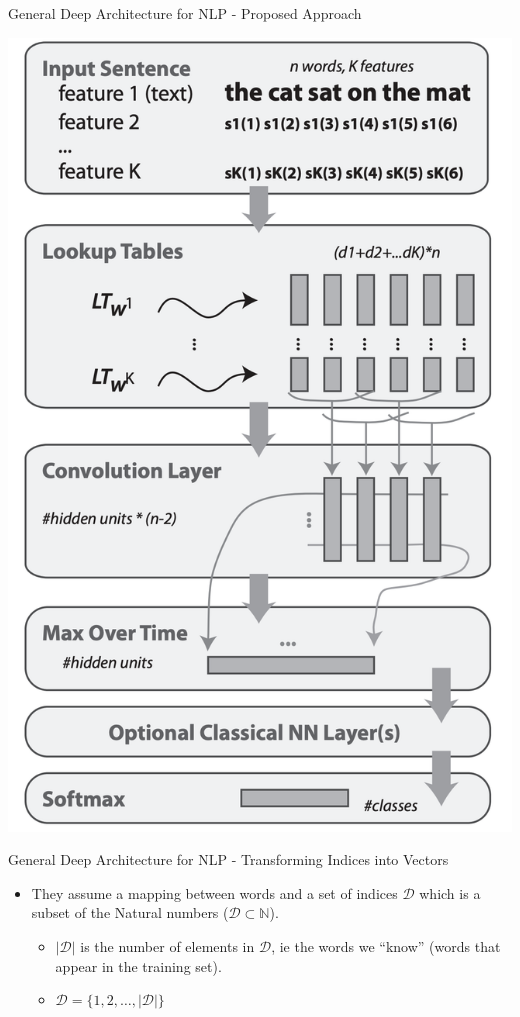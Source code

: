 \documentclass[handout]{beamer} %
\begin{document}
  \begin{frame}{General Deep Architecture for NLP - Proposed Approach}
      \begin{center}
          \includegraphics[scale=0.25]{imgs/Architecture.png}
      \end{center}
  \end{frame}

  \begin{frame}{General Deep Architecture for NLP - Transforming Indices into Vectors}
      \begin{itemize}[<+->]
          \item They assume a mapping between words and a set of indices
              $\mathcal{D}$ which is a subset of the Natural numbers
              ($\mathcal{D}\subset\mathbb{N}$).
              \begin{itemize}
                  \item $|\mathcal{D}|$ is the number of elements in
                      $\mathcal{D}$, ie the words we ``know'' (words
                      that appear in the training set).
                  \item $\mathcal{D} = \{1, 2, \ldots, |\mathcal{D}|\}$
              \end{itemize}
      \end{itemize}
  \end{frame}
\end{document}
